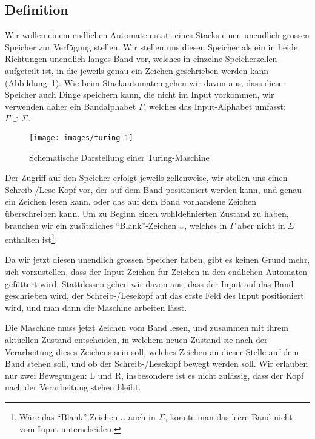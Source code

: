 \subsection{Definition}
%
%
%
Wir wollen einem endlichen Automaten statt eines Stacks einen unendlich
grossen Speicher zur Verfügung stellen. Wir stellen uns diesen
Speicher als ein in beide Richtungen unendlich langes Band vor,
welches in einzelne Speicherzellen aufgeteilt ist, in die jeweils
genau ein Zeichen geschrieben werden kann (Abbildung~\ref{turingfig}).
Wie beim Stackautomaten gehen
wir davon aus, dass dieser Speicher auch Dinge speichern kann, die nicht
im Input vorkommen, wir verwenden daher ein Bandalphabet $\Gamma$, welches
das Input-Alphabet umfasst: $\Gamma\supset \Sigma$.

\begin{figure}
\begin{center}
\texttt{[image: images/turing-1]}
\end{center}
\caption{Schematische Darstellung einer Turing-Maschine\label{turingfig}}
\end{figure}

Der Zugriff auf den Speicher erfolgt jeweils zellenweise, wir stellen
uns einen Schreib-/Lese-Kopf vor, der auf dem Band positioniert werden
kann, und genau ein Zeichen lesen kann, oder das auf dem Band vorhandene
Zeichen überschreiben kann. Um zu Beginn einen wohldefinierten Zustand
zu haben, brauchen wir ein zusätzliches ``Blank''-Zeichen $\blank$,
welches in $\Gamma$ aber nicht in $\Sigma$ enthalten ist\footnote{Wäre
das ``Blank''-Zeichen $\blank$ auch in $\Sigma$, könnte man das
leere Band nicht vom Input unterscheiden.}.

Da wir jetzt diesen unendlich grossen Speicher haben, gibt es keinen
Grund mehr, sich vorzustellen, dass der Input Zeichen für Zeichen
in den endlichen Automaten gefüttert wird. Stattdessen gehen wir
davon aus, dass der Input auf das Band geschrieben wird, der
Schreib-/Lesekopf auf das erste Feld des Input positioniert wird,
und man dann die Maschine arbeiten lässt.

Die Maschine muss jetzt Zeichen vom Band lesen, und zusammen mit
ihrem aktuellen Zustand entscheiden, in welchem neuen Zustand
sie nach der Verarbeitung dieses Zeichens sein soll, welches Zeichen
an dieser Stelle auf dem Band stehen soll, und ob der Schreib-/Lesekopf
bewegt werden soll. Wir erlauben nur zwei Bewegungen: L und R, insbesondere
ist es nicht zulässig, dass der Kopf nach der Verarbeitung stehen
bleibt.

